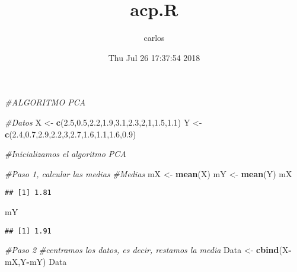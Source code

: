\documentclass[]{article}
\title{acp.R}
\author{carlos}
\date{Thu Jul 26 17:37:54 2018}
\newenvironment{Shaded}{\begin{snugshade}}{\end{snugshade}}
\newcommand{\KeywordTok}[1]{\textcolor[rgb]{0.13,0.29,0.53}{\textbf{#1}}}
\newcommand{\DecValTok}[1]{\textcolor[rgb]{0.00,0.00,0.81}{#1}}
\newcommand{\FloatTok}[1]{\textcolor[rgb]{0.00,0.00,0.81}{#1}}
\newcommand{\StringTok}[1]{\textcolor[rgb]{0.31,0.60,0.02}{#1}}
\newcommand{\CommentTok}[1]{\textcolor[rgb]{0.56,0.35,0.01}{\textit{#1}}}
\newcommand{\OperatorTok}[1]{\textcolor[rgb]{0.81,0.36,0.00}{\textbf{#1}}}
\newcommand{\NormalTok}[1]{#1}
\begin{document}
\maketitle

\begin{Shaded}
\begin{Highlighting}[]
\CommentTok{#ALGORITMO PCA}

\CommentTok{#Datos}
\NormalTok{X <-}\StringTok{ }\KeywordTok{c}\NormalTok{(}\FloatTok{2.5}\NormalTok{,}\FloatTok{0.5}\NormalTok{,}\FloatTok{2.2}\NormalTok{,}\FloatTok{1.9}\NormalTok{,}\FloatTok{3.1}\NormalTok{,}\FloatTok{2.3}\NormalTok{,}\DecValTok{2}\NormalTok{,}\DecValTok{1}\NormalTok{,}\FloatTok{1.5}\NormalTok{,}\FloatTok{1.1}\NormalTok{)}
\NormalTok{Y <-}\StringTok{ }\KeywordTok{c}\NormalTok{(}\FloatTok{2.4}\NormalTok{,}\FloatTok{0.7}\NormalTok{,}\FloatTok{2.9}\NormalTok{,}\FloatTok{2.2}\NormalTok{,}\DecValTok{3}\NormalTok{,}\FloatTok{2.7}\NormalTok{,}\FloatTok{1.6}\NormalTok{,}\FloatTok{1.1}\NormalTok{,}\FloatTok{1.6}\NormalTok{,}\FloatTok{0.9}\NormalTok{)}

\CommentTok{#Inicializamos el algoritmo PCA}

\CommentTok{#Paso 1, calcular las medias}
\CommentTok{#Medias}
\NormalTok{mX <-}\StringTok{ }\KeywordTok{mean}\NormalTok{(X)}
\NormalTok{mY <-}\StringTok{ }\KeywordTok{mean}\NormalTok{(Y)}
\NormalTok{mX}
\end{Highlighting}
\end{Shaded}

\begin{verbatim}
## [1] 1.81
\end{verbatim}

\begin{Shaded}
\begin{Highlighting}[]
\NormalTok{mY}
\end{Highlighting}
\end{Shaded}

\begin{verbatim}
## [1] 1.91
\end{verbatim}

\begin{Shaded}
\begin{Highlighting}[]
\CommentTok{#Paso 2}
\CommentTok{#centramos los datos, es decir, restamos la media}
\NormalTok{Data <-}\StringTok{ }\KeywordTok{cbind}\NormalTok{(X}\OperatorTok{-}\NormalTok{mX,Y}\OperatorTok{-}\NormalTok{mY)}
\NormalTok{Data}
\end{Highlighting}
\end{Shaded}
\end{document}
